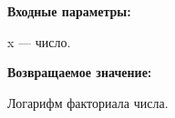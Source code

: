 \textbf{Входные параметры:}  
 
 x --- число.

\textbf{Возвращаемое значение:}

 Логарифм факториала числа.